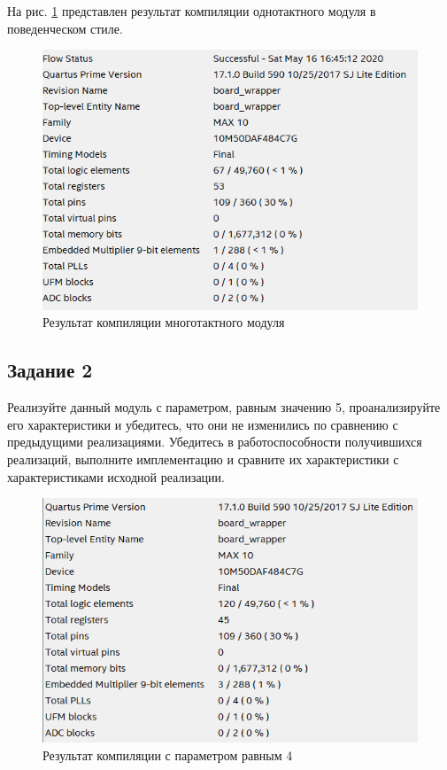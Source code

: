 \documentclass[a4paper,14pt]{article}
\begin{document}
	На рис. \ref{fig:z106} представлен результат компиляции однотактного модуля в поведенческом стиле.
	
	{\small {}}
	
	\begin{figure}[H]
		\centering
		\includegraphics[width=0.8\linewidth]{images/z1_06}
		\caption{Результат компиляции многотактного модуля}
		\label{fig:z106}
	\end{figure}
		
	
	\subsection{Задание 2}
	
	Реализуйте данный модуль с параметром, равным значению 5, проанализируйте его характеристики и убедитесь, что они не изменились по сравнению с предыдущими	реализациями. Убедитесь в работоспособности получившихся реализаций, выполните имплементацию и сравните их характеристики с характеристиками исходной реализации.
	
	\begin{figure}[H]
		\centering
		\includegraphics[width=0.8\linewidth]{images/z2_4}
		\caption{Результат компиляции с параметром равным 4}
		\label{fig:z24}
	\end{figure}
	
\end{document}
